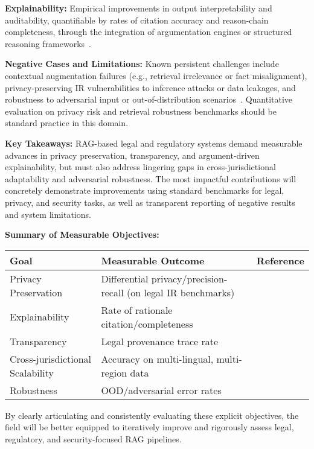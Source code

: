 \documentclass[sigconf]{acmart}
\begin{document}
\textbf{Explainability:} Empirical improvements in output interpretability and auditability, quantifiable by rates of citation accuracy and reason-chain completeness, through the integration of argumentation engines or structured reasoning frameworks~\cite{ref13}.

\textbf{Negative Cases and Limitations:} Known persistent challenges include contextual augmentation failures (e.g., retrieval irrelevance or fact misalignment), privacy-preserving IR vulnerabilities to inference attacks or data leakages, and robustness to adversarial input or out-of-distribution scenarios~\cite{ref26}. Quantitative evaluation on privacy risk and retrieval robustness benchmarks should be standard practice in this domain.

\textbf{Key Takeaways:} RAG-based legal and regulatory systems demand measurable advances in privacy preservation, transparency, and argument-driven explainability, but must also address lingering gaps in cross-jurisdictional adaptability and adversarial robustness. The most impactful contributions will concretely demonstrate improvements using standard benchmarks for legal, privacy, and security tasks, as well as transparent reporting of negative results and system limitations.

\vspace{0.5em}
\noindent\textbf{Summary of Measurable Objectives:}
\begin{center}
\begin{tabular}{@{}lll@{}}
\toprule
\textbf{Goal} & \textbf{Measurable Outcome} & \textbf{Reference} \\
\midrule
Privacy Preservation & Differential privacy/precision-recall (on legal IR benchmarks) & \cite{ref21, ref22, ref23, ref26, ref63} \\
Explainability & Rate of rationale citation/completeness & \cite{ref13, ref63} \\
Transparency & Legal provenance trace rate & \cite{ref13, ref63} \\
Cross-jurisdictional Scalability & Accuracy on multi-lingual, multi-region data & \cite{ref13, ref26} \\
Robustness & OOD/adversarial error rates & \cite{ref26} \\
\bottomrule
\end{tabular}
\end{center}
\vspace{0.5em}

By clearly articulating and consistently evaluating these explicit objectives, the field will be better equipped to iteratively improve and rigorously assess legal, regulatory, and security-focused RAG pipelines.
\end{document}
